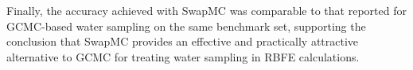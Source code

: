 \documentclass[journal=jacsat,manuscript=article]{achemso}
\begin{document}
Finally, the accuracy achieved with SwapMC was comparable to that reported for GCMC-based water sampling on the same benchmark set, 
supporting the conclusion that SwapMC provides an effective and practically attractive alternative to GCMC for treating water sampling in RBFE calculations. \\

\end{document}
